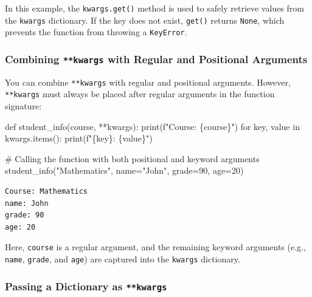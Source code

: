 \documentclass[
  letterpaper,
  DIV=11,
  numbers=noendperiod]{scrreprt}
\newenvironment{Shaded}{\begin{snugshade}}{\end{snugshade}}
\newcommand{\BuiltInTok}[1]{\textcolor[rgb]{0.00,0.23,0.31}{#1}}
\newcommand{\CommentTok}[1]{\textcolor[rgb]{0.37,0.37,0.37}{#1}}
\newcommand{\ControlFlowTok}[1]{\textcolor[rgb]{0.00,0.23,0.31}{#1}}
\newcommand{\DecValTok}[1]{\textcolor[rgb]{0.68,0.00,0.00}{#1}}
\newcommand{\KeywordTok}[1]{\textcolor[rgb]{0.00,0.23,0.31}{#1}}
\newcommand{\NormalTok}[1]{\textcolor[rgb]{0.00,0.23,0.31}{#1}}
\newcommand{\OperatorTok}[1]{\textcolor[rgb]{0.37,0.37,0.37}{#1}}
\newcommand{\SpecialCharTok}[1]{\textcolor[rgb]{0.37,0.37,0.37}{#1}}
\newcommand{\SpecialStringTok}[1]{\textcolor[rgb]{0.13,0.47,0.30}{#1}}
\newcommand{\StringTok}[1]{\textcolor[rgb]{0.13,0.47,0.30}{#1}}
\begin{document}
In this example, the \texttt{kwargs.get()} method is used to safely
retrieve values from the \texttt{kwargs} dictionary. If the key does not
exist, \texttt{get()} returns \texttt{None}, which prevents the function
from throwing a \texttt{KeyError}.

\hypertarget{combining-kwargs-with-regular-and-positional-arguments}{%
\subsubsection{\texorpdfstring{Combining \texttt{**kwargs} with Regular
and Positional
Arguments}{Combining **kwargs with Regular and Positional Arguments}}\label{combining-kwargs-with-regular-and-positional-arguments}}

You can combine \texttt{**kwargs} with regular and positional arguments.
However, \texttt{**kwargs} must always be placed after regular arguments
in the function signature:

\begin{Shaded}
\begin{Highlighting}[]
\KeywordTok{def}\NormalTok{ student\_info(course, }\OperatorTok{**}\NormalTok{kwargs):}
    \BuiltInTok{print}\NormalTok{(}\SpecialStringTok{f"Course: }\SpecialCharTok{\{}\NormalTok{course}\SpecialCharTok{\}}\SpecialStringTok{"}\NormalTok{)}
    \ControlFlowTok{for}\NormalTok{ key, value }\KeywordTok{in}\NormalTok{ kwargs.items():}
        \BuiltInTok{print}\NormalTok{(}\SpecialStringTok{f"}\SpecialCharTok{\{}\NormalTok{key}\SpecialCharTok{\}}\SpecialStringTok{: }\SpecialCharTok{\{}\NormalTok{value}\SpecialCharTok{\}}\SpecialStringTok{"}\NormalTok{)}

\CommentTok{\# Calling the function with both positional and keyword arguments}
\NormalTok{student\_info(}\StringTok{"Mathematics"}\NormalTok{, name}\OperatorTok{=}\StringTok{"John"}\NormalTok{, grade}\OperatorTok{=}\DecValTok{90}\NormalTok{, age}\OperatorTok{=}\DecValTok{20}\NormalTok{)}
\end{Highlighting}
\end{Shaded}

\begin{verbatim}
Course: Mathematics
name: John
grade: 90
age: 20
\end{verbatim}

Here, \texttt{course} is a regular argument, and the remaining keyword
arguments (e.g., \texttt{name}, \texttt{grade}, and \texttt{age}) are
captured into the \texttt{kwargs} dictionary.

\hypertarget{passing-a-dictionary-as-kwargs}{%
\subsubsection{\texorpdfstring{Passing a Dictionary as
\texttt{**kwargs}}{Passing a Dictionary as **kwargs}}\label{passing-a-dictionary-as-kwargs}}
\end{document}
